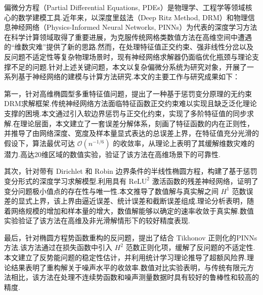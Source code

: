 
%

\begin{cnabstract}

偏微分方程（Partial Differential Equations, PDEs）是物理学、工程学等领域核心的数学建模工具.近年来，以深度里兹法（Deep Ritz Method, DRM）和物理信息神经网络（Physics-Informed Neural Networks, PINNs）为代表的深度学习方法在科学计算领域取得了重要进展，为克服传统网格类数值方法在高维空间中遭遇的“维数灾难”提供了新的思路.然而，在处理特征值正交约束、强非线性分岔以及反问题不适定性等复杂物理场景时，现有神经网络求解器仍面临优化瓶颈与理论支撑不足的问题.针对上述关键问题，本文以复杂偏微分系统为研究对象，开展了一系列基于神经网络的建模与计算方法研究.本文的主要工作与研究成果如下：

第一，针对高维椭圆型多重特征值问题，提出了一种基于惩罚变分原理的无约束DRM求解框架.传统神经网络方法面临特征函数正交约束难以实现且缺乏泛化理论支撑的困境.本文通过引入软边界惩罚与正交化约束，实现了多阶特征值的同步求解.在理论层面，本文建立了一套误差分解体系，刻画了特征函数的内在正则性，并推导了由网络深度、宽度及样本量显式表达的总误差上界，在特征值充分光滑的假设下，算法最优可达 $\mathcal{O}(n^{-1/6})$ 的收敛率，从理论上表明了其缓解维数灾难的潜力.高达20维区域的数值实验，验证了该方法在高维场景下的可靠性.

其次，针对带有 Dirichlet 和 Robin 边界条件的半线性椭圆方程，构建了基于惩罚变分形式的深度学习求解模型.利用具有 $\mathrm{ReLU}^2$ 激活函数的残差神经网络，证明了变分问题极小值点的存在性与唯一性.本文推导了数值解与真实解之间 $H^1$ 范数误差的显式上界，该上界由逼近误差、统计误差和截断误差组成.理论分析表明，随着网络规模的增加和样本量的增大，数值解能够以确定的速率收敛于真实解.数值实验验证了该方法在高维及非光滑解情形下的较好精度表现.

最后，针对椭圆方程势函数重构的反问题，提出了结合 Tikhonov 正则化的PINNs方法.该方法通过在损失函数中引入 $H^2$ 范数正则化项，缓解了反问题的不适定性.本文建立了反势能问题的稳定性估计，并利用统计学习理论推导了超额风险界.理论结果表明了重构解关于噪声水平的收敛率.数值对比实验表明，与传统有限元方法相比，该方法在处理不连续势函数和噪声测量数据时具有较好的鲁棒性和较高的精度.

\end{cnabstract}
\vspace{1em}\par\vfill

